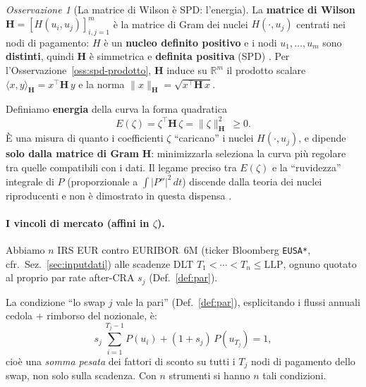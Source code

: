 \documentclass[11pt,a4paper]{article}
\theoremstyle{plain}
\theoremstyle{definition}
\theoremstyle{remark}
\newtheorem*{osservazione}{Osservazione}
\newcommand{\LLP}{\ensuremath{\mathrm{LLP}}}
\newcommand{\Hmat}{\mathbf{H}}
\newcommand{\transp}{^{\!\top}}
\begin{document}
\begin{osservazione}[La matrice di Wilson \`e SPD: l'energia]
\label{oss:energia}
La \textbf{matrice di Wilson} $\Hmat = [H(u_i,u_j)]_{i,j=1}^{m}$ \`e la matrice di Gram
dei nuclei $H(\cdot,u_j)$ centrati nei nodi di pagamento: $H$ \`e un \textbf{nucleo definito
positivo} e i nodi $u_1,\ldots,u_m$ sono \textbf{distinti}, quindi $\Hmat$ \`e simmetrica e
\textbf{definita positiva} (SPD) \cite{fasshauer2007,lageras2016}.
Per l'Osservazione~\ref{oss:spd-prodotto}, $\Hmat$ induce su $\mathbb{R}^m$ il prodotto
scalare $\langle x,y\rangle_{\Hmat} = x\transp\Hmat\,y$ e la norma $\|x\|_{\Hmat} = \sqrt{x\transp\Hmat\,x}$.

Definiamo \textbf{energia} della curva la forma quadratica
\[
  E(\zeta) = \zeta\transp \Hmat\, \zeta = \|\zeta\|_{\Hmat}^2 \ \ge 0 .
\]
\`E una misura di quanto i coefficienti $\zeta$ ``caricano'' i nuclei $H(\cdot,u_j)$,
e dipende \textbf{solo dalla matrice di Gram} $\Hmat$: minimizzarla seleziona la curva
pi\`u regolare tra quelle compatibili con i dati. Il legame preciso tra $E(\zeta)$ e la
``ruvidezza'' integrale di $P$ (proporzionale a $\int |P''|^2\,dt$) discende dalla
teoria dei nuclei riproducenti e non \`e dimostrato in questa dispensa \cite{fasshauer2007}.
\end{osservazione}

\paragraph{I vincoli di mercato (affini in $\zeta$).}
Abbiamo $n$ IRS EUR contro EURIBOR~6M (ticker Bloomberg \texttt{EUSA*},
cfr.~Sez.~\ref{sec:inputdati}) alle scadenze DLT $T_1<\cdots<T_n\le\LLP$, ognuno quotato al
proprio par rate after-CRA $s_j$ (Def.~\ref{def:par}).

La condizione ``lo swap $j$ vale la pari'' (Def.~\ref{def:par}), esplicitando i flussi
annuali cedola + rimborso del nozionale, \`e:
\[
  s_j\,\sum_{i=1}^{T_j-1} P(u_i) + (1+s_j)\,P(u_{T_j}) = 1,
\]
cio\`e una \emph{somma pesata} dei fattori di sconto su tutti i $T_j$ nodi di pagamento dello
swap, non solo sulla scadenza. Con $n$ strumenti si hanno $n$ tali condizioni.
\end{document}
